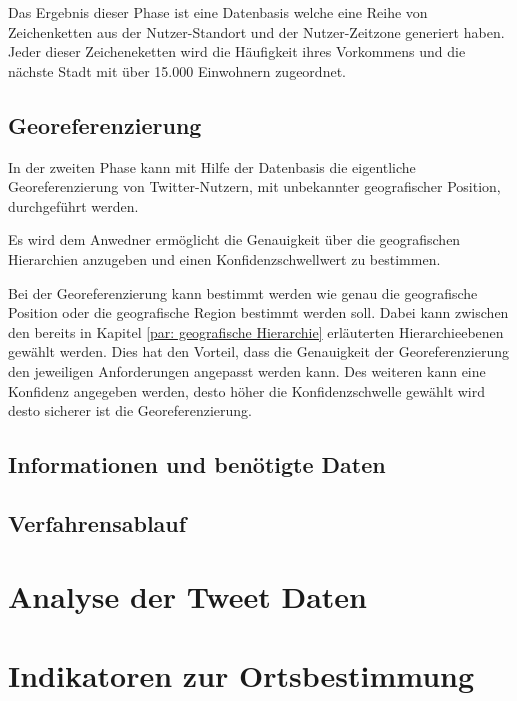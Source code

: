 	 

	Das Ergebnis dieser Phase ist eine Datenbasis welche eine Reihe von Zeichenketten aus der Nutzer-Standort und der Nutzer-Zeitzone generiert haben. 
	Jeder dieser Zeicheneketten wird die Häufigkeit ihres Vorkommens und die nächste Stadt mit über 15.000 Einwohnern zugeordnet. 


	\subsection{Georeferenzierung}  

	In der zweiten Phase kann mit Hilfe der Datenbasis die eigentliche Georeferenzierung von Twitter-Nutzern, mit unbekannter geografischer Position, durchgeführt werden. 

	Es wird dem Anwedner ermöglicht die Genauigkeit über die geografischen Hierarchien anzugeben und einen Konfidenzschwellwert zu bestimmen.


	Bei der Georeferenzierung kann bestimmt werden wie genau die geografische Position oder die geografische Region bestimmt werden soll. 
	Dabei kann zwischen den bereits in Kapitel \ref{par: geografische Hierarchie} erläuterten Hierarchieebenen gewählt werden.
	Dies hat den Vorteil, dass die Genauigkeit der Georeferenzierung den jeweiligen Anforderungen angepasst werden kann.
	Des weiteren kann eine Konfidenz angegeben werden, desto höher die Konfidenzschwelle gewählt wird desto sicherer ist die Georeferenzierung. 







	\subsection{Informationen und benötigte Daten}

	\subsection{Verfahrensablauf}


\section{Analyse der Tweet Daten}

\section{Indikatoren zur Ortsbestimmung}

